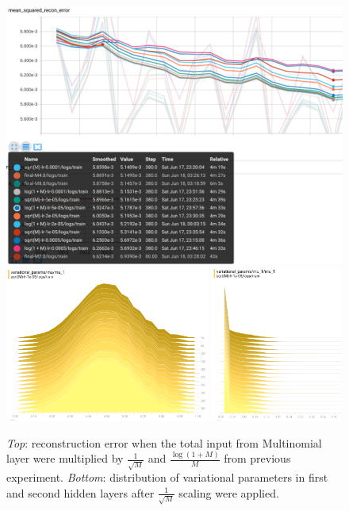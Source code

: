 \begin{figure}[h]
\begin{mdframed}
\centering
\includegraphics[width=5in]{dbm-cifar/instab_resolved.png}
\\[2em]
\includegraphics[height=2in]{dbm-cifar/mu_after.png}
\quad
\includegraphics[height=2in]{dbm-cifar/mu_1_after.png}
\caption{\emph{Top}: reconstruction error when the total input from Multinomial layer were multiplied by $\frac{1}{\sqrt{M}}$ and $\frac{\log(1+M)}{M}$ from previous experiment. \emph{Bottom}: distribution of variational parameters in first and second hidden layers after $\frac{1}{\sqrt{M}}$ scaling were applied.}
\end{mdframed}
\end{figure}

